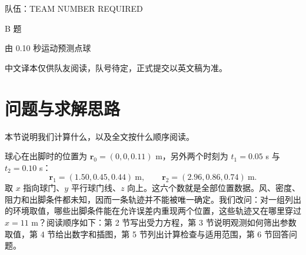\documentclass[11pt,a4paper,UTF8,fontset=windows]{ctexart}
\begin{document}
\begin{center}
{\large 队伍：TEAM NUMBER REQUIRED}\par\vspace{12mm}
{\Large B 题}\par\vspace{10mm}
{\LARGE 由 0.10 秒运动预测点球}\par\vspace{8mm}
\end{center}
\vspace{6mm}
\begin{center}
{\small 中文译本仅供队友阅读，队号待定，正式提交以英文稿为准。}
\end{center}
\vspace{4mm}
\begin{abstract}
题给点球早期的两个位置，但风、空气密度和阻力系数都没有测量。本文只用一个明确的受力模型，回答球的其余飞行可能是什么样。模型从出脚到球门平面全程考虑重力、相对空气的二次阻力和写成叉乘的有效侧向力；侧向项不是自旋的测量，而是自旋与升力的合并效果。对每一组列出的风速、密度和阻力系数，我们用两个位置反求初速度与两个侧向系数。只有六个坐标残差都在允许误差内，这组参数才被接受。列出的一共有 210 组参数，其中 86 组在 5 mm 允许误差下被接受；它们的球门平面坐标覆盖 $y\in[2.5384,2.6812]$ m、$z\in[1.9451,1.9867]$ m，两条被接受的轨迹落点相距 0.1477 m。当前示例取风速 8.0 m/s、密度 1.225 kg/m$^3$、$C_D=0.350$，球心在 0.4042 s 时穿过球门平面于 $(2.6087,1.9598)$ m。落点的分散说明两次观测不能选出唯一落点，但它不是概率。MATLAB 检查包括三档步长、功与能平衡和事件检查。没有独立的实测全程飞行，因此这些检查验证计算过程，模型还需实测飞行确认。只搜索列出的参数，图中的范围不能保证包含所有可能情况。
\end{abstract}
\clearpage

\section{问题与求解思路}
本节说明我们计算什么，以及全文按什么顺序阅读。

球心在出脚时的位置为 $\mathbf r_0=(0,0,0.11)$ m，另外两个时刻为 $t_1=0.05$ s 与 $t_2=0.10$ s：
\begin{equation}
\mathbf r_1=(1.50, 0.45, 0.44)\ \mathrm m,\qquad
\mathbf r_2=(2.96, 0.86, 0.74)\ \mathrm m.
\end{equation}
取 $x$ 指向球门、$y$ 平行球门线、$z$ 向上。这六个数就是全部位置数据。风、密度、阻力和出脚条件都未知，因而一条轨迹并不能被唯一确定。我们改问：对一组列出的环境取值，哪些出脚条件能在允许误差内重现两个位置，这些轨迹又在哪里穿过 $x=11$ m？阅读顺序如下：第 2 节写出受力方程，第 3 节说明观测如何筛出参数取值，第 4 节给出数字和插图，第 5 节列出计算检查与适用范围，第 6 节回答问题。
\end{document}
